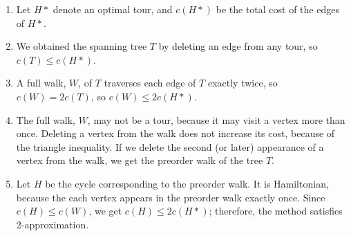 \begin{enumerate}
	\item Let $H*$ denote an optimal tour, and $c(H*)$ be the total cost of the edges of $H*$.  
	\item We obtained the spanning tree $T$ by deleting an edge from any tour, so $c(T) \le c(H*)$.  
	\item A full walk, $W$, of $T$ traverses each edge of $T$ exactly twice, so $c(W) = 2 c(T)$, so $c(W) \le 2c(H*)$.  
	\item The full walk, $W$, may not be a tour, because it may visit a vertex more than once.  Deleting a vertex from the walk does not increase its cost, because of the triangle inequality.  If we delete the second (or later) appearance of a vertex from the walk, we get the preorder walk of the tree $T$.  
	\item Let $H$ be the cycle corresponding to the preorder walk. It is Hamiltonian, because the each vertex appears in the preorder walk exactly once.  Since $c(H) \le c(W)$, we get $c(H) \le 2 c(H*)$; therefore, the method satisfies 2-approximation.   
\end{enumerate}


